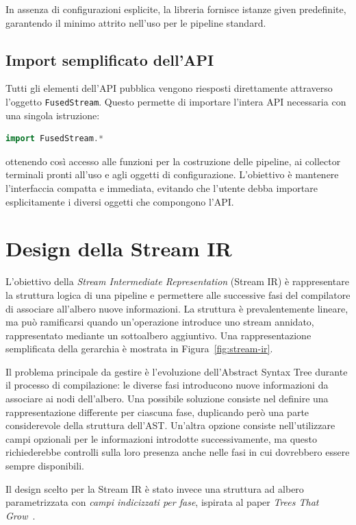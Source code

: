 \documentclass[a4paper,11pt]{report}
\theoremstyle{definition}
\begin{document}
In assenza di configurazioni esplicite, la libreria fornisce istanze given predefinite, garantendo il minimo attrito nell'uso per le pipeline standard.

\subsection{Import semplificato dell'API}
Tutti gli elementi dell'API pubblica vengono riesposti direttamente attraverso l'oggetto \texttt{FusedStream}. Questo permette di importare l'intera API necessaria con una singola istruzione:

\begin{lstlisting}[language=Scala]
import FusedStream.*
\end{lstlisting}

ottenendo così accesso alle funzioni per la costruzione delle pipeline, ai collector terminali pronti all'uso e agli oggetti di configurazione. L'obiettivo è mantenere l'interfaccia compatta e immediata, evitando che l'utente debba importare esplicitamente i diversi oggetti che compongono l'API.

\section{Design della Stream IR}
\label{sec:stream-ir}

L'obiettivo della \emph{Stream Intermediate Representation} (Stream IR) è rappresentare la struttura logica di una pipeline e permettere alle successive fasi del compilatore di associare all'albero nuove informazioni. La struttura è prevalentemente lineare, ma può ramificarsi quando un'operazione introduce uno stream annidato, rappresentato mediante un sottoalbero aggiuntivo. Una rappresentazione semplificata della gerarchia è mostrata in Figura~\ref{fig:stream-ir}.

Il problema principale da gestire è l'evoluzione dell'Abstract Syntax Tree durante il processo di compilazione: le diverse fasi introducono nuove informazioni da associare ai nodi dell'albero. Una possibile soluzione consiste nel definire una rappresentazione differente per ciascuna fase, duplicando però una parte considerevole della struttura dell'AST. Un'altra opzione consiste nell'utilizzare campi opzionali per le informazioni introdotte successivamente, ma questo richiederebbe controlli sulla loro presenza anche nelle fasi in cui dovrebbero essere sempre disponibili.

Il design scelto per la Stream IR è stato invece una struttura ad albero parametrizzata con \emph{campi indicizzati per fase}, ispirata al paper \emph{Trees That Grow}~\cite{najd2017trees}.
\end{document}
